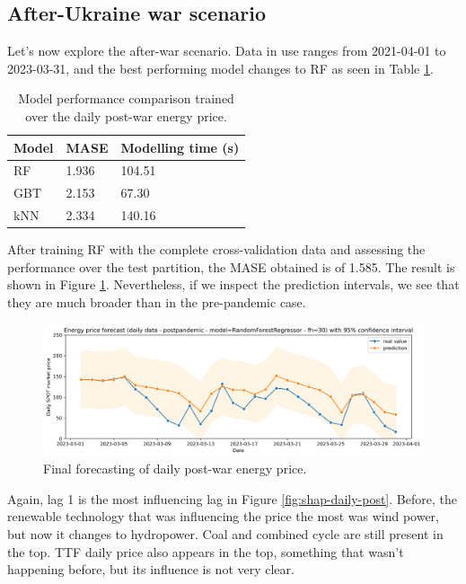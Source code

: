 \subsection{After-Ukraine war scenario}
Let's now explore the after-war scenario. Data in use ranges from 2021-04-01 to 2023-03-31, and the best performing model changes to RF as seen in Table \ref{tab:cv-daily-post}.

\begin{table}[H]
\centering
\begin{tabular}{@{}l|l|l@{}}
\toprule
Model & MASE  & Modelling time (s)  \\ \midrule
RF    & 1.936 & 104.51  \\
GBT   & 2.153 & 67.30   \\
kNN   & 2.334 & 140.16  \\ \bottomrule
\end{tabular}
\caption{Model performance comparison trained over the daily post-war energy price.}
\label{tab:cv-daily-post}
\end{table}

After training RF with the complete cross-validation data and assessing the performance over the test partition, the MASE obtained is of 1.585. The result is shown in Figure \ref{fig:forecast-daily-post}. Nevertheless, if we inspect the prediction intervals, we see that they are much broader than in the pre-pandemic case.

\begin{figure}[H]
\centering
    \caption{Final forecasting of daily post-war energy price.}
    \label{fig:forecast-daily-post}
    \includegraphics[scale=0.4]{images/analysis/forecast-daily-post}
\end{figure}

Again, lag 1 is the most influencing lag in Figure \ref{fig:shap-daily-post}. Before, the renewable technology that was influencing the price the most was wind power, but now it changes to hydropower. Coal and combined cycle are still present in the top. TTF daily price also appears in the top, something that wasn't happening before, but its influence is not very clear.

